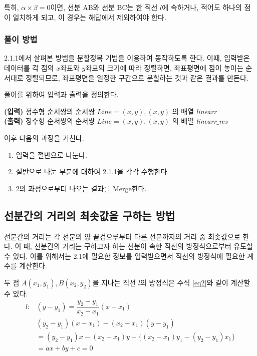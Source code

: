 \documentclass[10pt,a4paper]{article}
\begin{document}
\begin{spacing}{1.6}
   	특히, $\alpha \times \beta = 0$이면, 선분 AB와 선분 BC는 한 직선 $l$에 속하거나, 적어도 하나의 점이 일치하게 되고, 이 경우는 해답에서 제외하여야 한다.
\subsubsection{풀이 방법}
  2.1.1에서 살펴본 방법을 분할정복 기법을 이용하여 동작하도록 한다. 이때, 입력받은 데이터를 각 점의 $x$좌표와 $y$좌표의 크기에 따라 정렬하면, 좌표평면에 점이 놓이는 순서대로 정렬되므로, 좌표평면을 일정한 구간으로 분할하는 것과 같은 결과를 만든다. 
  
  풀이를 위하여 입력과 출력을 정의한다.
  \begin{center}
  	\textbf{(입력)} 정수형 순서쌍의 순서쌍 $Line = (x,y),(x,y)$ 의 배열 \textit{linearr} \\
  	\textbf{(출력)} 정수형 순서쌍의 순서쌍  $Line = (x,y),(x,y)$ 의 배열 \textit{linearr$\_$res}
  \end{center}

  이후 다음의 과정을 거친다. 
  \begin{enumerate}
  	\item 입력을 절반으로 나눈다.
  	\item 절반으로 나눈 부분에 대하여 2.1.1을 각각 수행한다.
  	\item 2의 과정으로부터 나오는 결과를 Merge한다.
  \end{enumerate}

\subsection{선분간의 거리의 최솟값을 구하는 방법}
  선분간의 거리는 각 선분의 양 끝검으루부터 다른 선분까지의 거리 중 최솟값으로 한다. 이 때, 선분간의 거리는 구하고자 하는 선분이 속한 직선의 방정식으로부터 유도할 수 있다. 이를 위해서는 2.1에 필요한 정보를 입력받으면서 직선의 방정식에 필요한 계수를 계산한다. 
  
  두 점 $A(x_1,y_1), B(x_2, y_2)$을 지나는 직선 $l$의 방정식은 수식 \ref{eq2}와 같이 계산할 수 있다. 
  	\begin{equation}
  	\begin{aligned}
 	 l : & (y-y_1) = \dfrac{y_2-y_1}{x_2-x_1} (x-x_1) \\
  		  & (y_2-y_1)(x-x_1)-(x_2-x_1)(y-y_1)\\
  	 	 & = (y_2-y_1)x - (x_2-x_1)y + \lbrace(x_2-x_1)y_1 - (y_2-y_1)x_1\rbrace\\
  	  	& = ax+by+c = 0
  \end{aligned}
	\label{eq2}  
	\end{equation}
	

\end{spacing}
\end{document}
